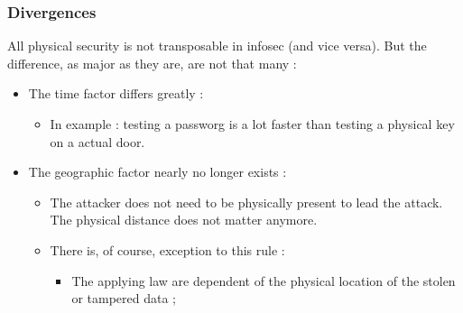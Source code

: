 \documentclass[11pt]{article} %
\begin{document}
\subsubsection{Divergences}

All physical security is not transposable in infosec (and vice versa). But 
the difference, as major as they are, are not that many :
\begin{itemize}
\item The time factor differs greatly :
\begin{itemize}
\item In example : testing a passworg is a lot faster than testing a physical
key on a actual door. 
\end{itemize}
\item The geographic factor nearly no longer exists :
	\begin{itemize}
\item The attacker does not need to be physically present to lead the attack. 
The physical distance does not matter anymore.
	\item There is, of course, exception to this rule  :
		\begin{itemize}
\item The applying law are dependent of the physical location of the stolen or 
tampered data ;

\end{itemize}
\end{itemize}
\end{itemize}
\end{document}
